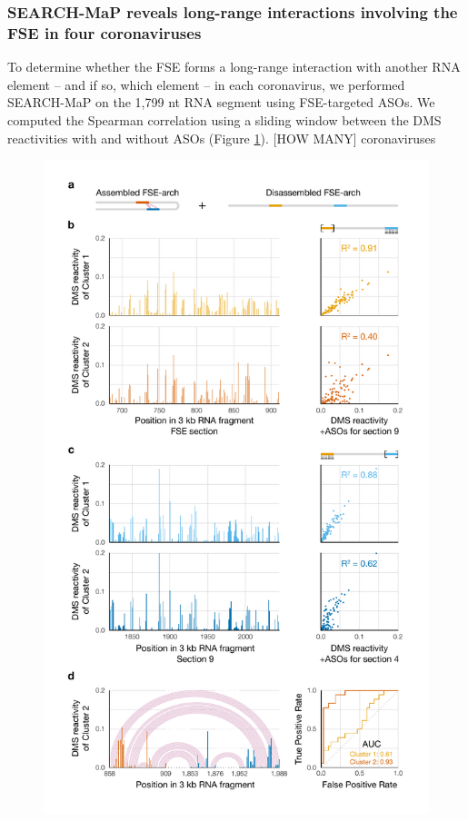 \documentclass[main.tex]{subfiles}
\begin{document}
\subsubsection{SEARCH-MaP reveals long-range interactions involving the FSE in four coronaviruses}

To determine whether the FSE forms a long-range interaction with another RNA element -- and if so, which element -- in each coronavirus, we performed SEARCH-MaP on the 1,799 nt RNA segment using FSE-targeted ASOs.
We computed the Spearman correlation using a sliding window between the DMS reactivities with and without ASOs (Figure \ref{fig3}).
[HOW MANY] coronaviruses 

\begin{figure}[H]
	\includegraphics[height=0.95\textheight]{../MainFigures/fig3.pdf}
	\caption{}
	\label{fig3}
\end{figure}
\end{document}
